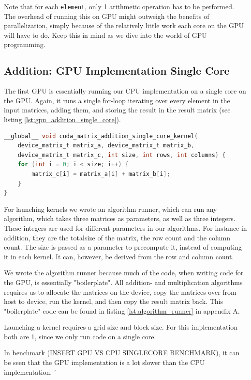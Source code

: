 Note that for each \texttt{element}, only 1 arithmetic operation has to be performed. The overhead of running this on GPU might outweigh the benefits of parallelization, simply because of the relatively little work each core on the GPU will have to do. Keep this in mind as we dive into the world of GPU programming.

\subsection{Addition: GPU Implementation Single Core}
The first GPU is essentially running our CPU implementation on a single core on the GPU. Again, it runs a single for-loop iterating over every element in the input matrices, adding them, and storing the result in the result matrix (see listing \ref{lst:gpu_addition_single_core}).

\begin{lstlisting}[language=C, caption={GPU addition single core}, label={lst:gpu_addition_single_core}]
__global__ void cuda_matrix_addition_single_core_kernel(
    device_matrix_t matrix_a, device_matrix_t matrix_b,
    device_matrix_t matrix_c, int size, int rows, int columns) {
    for (int i = 0; i < size; i++) {
        matrix_c[i] = matrix_a[i] + matrix_b[i];
    }
}
\end{lstlisting}

For launching kernels we wrote an algorithm runner, which can run any algorithm, which takes three matrices as parameters, as well as three integers. These integers are used for different parameters in our algorithms. For instance in addition, they are the totalsize of the matrix, the row count and the column count. The size is passed as a parameter to precompute it, instead of computing it in each kernel. It can, however, be derived from the row and column count. 

We wrote the algorithm runner because much of the code, when writing code for the GPU, is essentially "boilerplate". All addition- and multiplication algorithms requires us to allocate the matrices on the device, copy the matrices over from host to device, run the kernel, and then copy the result matrix back. This "boilerplate" code can be found in listing \ref{lst:algorithm_runner} in appendix A.

Launching a kernel requires a grid size and block size. For this implementation both are 1, since we only run code on a single core.

In benchmark (INSERT GPU VS CPU SINGLECORE BENCHMARK), it can be seen that the GPU implementation is a lot slower than the CPU implementation. '


